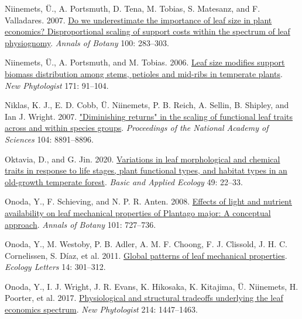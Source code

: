 \documentclass[
  12pt,
  a4paper,
,tablecaptionabove
]{scrartcl}
\newlength{\cslhangindent}
\newenvironment{CSLReferences}[2] %
 {%
  \setlength{\parindent}{0pt}
  \ifodd #1 \everypar{\setlength{\hangindent}{\cslhangindent}}\ignorespaces\fi
  \ifnum #2 > 0
  \setlength{\parskip}{#2\baselineskip}
  \fi
 }%
 {}
\begin{document}
\begin{CSLReferences}{1}{0}
\leavevmode{}%
Niinemets, Ü., A. Portsmuth, D. Tena, M. Tobias, S. Matesanz, and F. Valladares. 2007. \href{https://doi.org/10.1093/aob/mcm107}{Do we underestimate the importance of leaf size in plant economics? {Disproportional} scaling of support costs within the spectrum of leaf physiognomy}. \emph{Annals of Botany} 100: 283--303.

\leavevmode{}%
Niinemets, Ü., A. Portsmuth, and M. Tobias. 2006. \href{https://doi.org/10.1111/j.1469-8137.2006.01741.x}{Leaf size modifies support biomass distribution among stems, petioles and mid-ribs in temperate plants}. \emph{New Phytologist} 171: 91--104.

\leavevmode{}%
Niklas, K. J., E. D. Cobb, Ü. Niinemets, P. B. Reich, A. Sellin, B. Shipley, and Ian J. Wright. 2007. \href{https://doi.org/10.1073/pnas.0701135104}{"{Diminishing} returns" in the scaling of functional leaf traits across and within species groups}. \emph{Proceedings of the National Academy of Sciences} 104: 8891--8896.

\leavevmode{}%
Oktavia, D., and G. Jin. 2020. \href{https://doi.org/10.1016/j.baae.2020.09.010}{Variations in leaf morphological and chemical traits in response to life stages, plant functional types, and habitat types in an old-growth temperate forest}. \emph{Basic and Applied Ecology} 49: 22--33.

\leavevmode{}%
Onoda, Y., F. Schieving, and N. P. R. Anten. 2008. \href{https://doi.org/10.1093/aob/mcn013}{Effects of light and nutrient availability on leaf mechanical properties of {Plantago} major: {A} conceptual approach}. \emph{Annals of Botany} 101: 727--736.

\leavevmode{}%
Onoda, Y., M. Westoby, P. B. Adler, A. M. F. Choong, F. J. Clissold, J. H. C. Cornelissen, S. Díaz, et al. 2011. \href{https://doi.org/10.1111/j.1461-0248.2010.01582.x}{Global patterns of leaf mechanical properties}. \emph{Ecology Letters} 14: 301--312.

\leavevmode{}%
Onoda, Y., I. J. Wright, J. R. Evans, K. Hikosaka, K. Kitajima, Ü. Niinemets, H. Poorter, et al. 2017. \href{https://doi.org/10.1111/nph.14496}{Physiological and structural tradeoffs underlying the leaf economics spectrum}. \emph{New Phytologist} 214: 1447--1463.


\end{CSLReferences}
\end{document}
